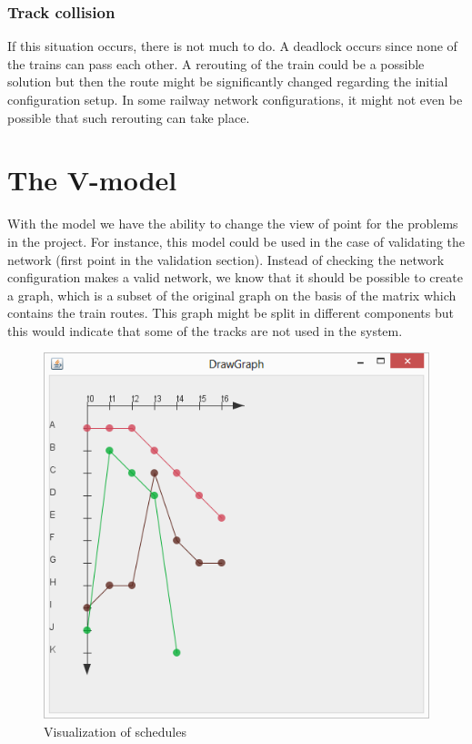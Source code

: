 \documentclass[10pt,a4paper]{article}
\begin{document}
\subsubsection{Track collision}
 
If this situation occurs, there is not much to do. A deadlock occurs since none of the trains can pass each other.
A rerouting of the train could be a possible solution but then the route might be significantly changed regarding the initial configuration setup. In some railway network configurations, it might not even be possible that such rerouting can take place.
 

\section{The V-model}
 
With the model we have the ability to change the view of point for the problems in the project.
For instance, this model could be used in the case of validating the network (first point in the validation section). Instead of checking the network configuration makes a valid network, we know that it should be possible to create a graph, which is a subset of the original graph on the basis of the matrix which contains the train routes. This graph might be split in different components but this would indicate that some of the tracks are not used in the system.
\begin{figure}[h]
\centering
\includegraphics[scale=0.6]{fig/graphical_schedule.png}
 \caption{Visualization of schedules}
 \label{fig:graphical_schedule}
\end{figure}
\end{document}
